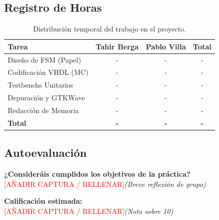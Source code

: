 \documentclass[12pt,a4paper]{article}
\newcommand{\pendiente}{\textcolor{red}{[AÑADIR CAPTURA / RELLENAR]}}
\begin{document}
    \subsection{Registro de Horas}
    \begin{table}[h]
    \centering
    \begin{tabular}{|l|c|c|c|}
    \hline
    \textbf{Tarea} & \textbf{Tahir Berga} & \textbf{Pablo Villa} & \textbf{Total} \\
    \hline
    Diseño de FSM (Papel) & - & - & - \\
    Codificación VHDL (MC) & - & - & - \\
    Testbenchs Unitarios & - & - & - \\
    Depuración y GTKWave & - & - & - \\
    Redacción de Memoria & - & - & - \\
    \hline
    \textbf{Total} & \textbf{-} & \textbf{-} & \textbf{-} \\
    \hline
    \end{tabular}
    \caption{Distribución temporal del trabajo en el proyecto.}
    \end{table}

    \subsection{Autoevaluación}
    \textbf{¿Consideráis cumplidos los objetivos de la práctica?} \\
    \pendiente \textit{(Breve reflexión de grupo)}

    \textbf{Calificación estimada:} \\
    \pendiente \textit{(Nota sobre 10)}

    
\end{document}
